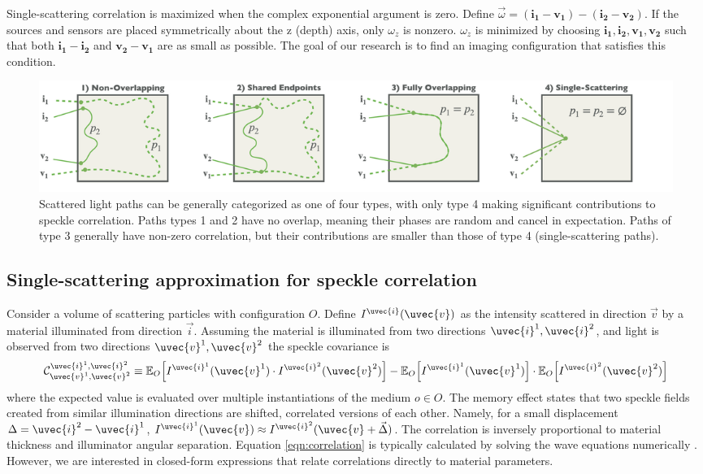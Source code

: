 Single-scattering correlation is maximized when the complex exponential argument is zero. Define $\vec{\omega} = (\mathbf{i_1} - \mathbf{v_1}) - (\mathbf{i_2} - \mathbf{v_2})$. If the sources and sensors are placed symmetrically about the z (depth) axis, only $\omega_z$ is nonzero. $\omega_z$ is minimized by choosing $\mathbf{i_1,i_2,v_1,v_2}$ such that both $\mathbf{i_1} - \mathbf{i_2}$ and $\mathbf{v_2} - \mathbf{v_1}$ are as small as possible. The goal of our research is to find an imaging configuration that satisfies this condition.
%
\begin{figure}
    \centering
    \includegraphics[width=\textwidth]{figures/path_types.png}
    \caption{Scattered light paths can be generally categorized as one of four types, with only type 4 making significant contributions to speckle correlation. Paths types 1 and 2 have no overlap, meaning their phases are random and cancel in expectation. Paths of type 3 generally have non-zero correlation, but their contributions are smaller than those of type 4 (single-scattering paths).}
    \label{fig:path_types}
\end{figure}

\subsection{Single-scattering approximation for speckle correlation}
Consider a volume of scattering particles with configuration $O$. Define $I^{\uvec{i}}(\uvec{v})$ as the intensity scattered in direction $\vec{v}$ by a material illuminated from direction $\vec{i}$. Assuming the material is illuminated from two directions $\uvec{i}^1, \uvec{i}^2$, and light is observed from two directions $\uvec{v}^1, \uvec{v}^2$ the speckle covariance is
%
\begin{equation}
    \mathcal{C}_{\uvec{v}^1,\uvec{v}^2}^{\uvec{i}^1,\uvec{i}^2} \equiv \mathbb{E}_O\Big[I^{\uvec{i}^1}(\uvec{v}^1) \cdot I^{\uvec{i}^2}(\uvec{v}^2)\Big] - \mathbb{E}_O\Big[I^{\uvec{i}^1}(\uvec{v}^1)\Big] \cdot \mathbb{E}_O\Big[I^{\uvec{i}^2}(\uvec{v}^2)\Big]
    \label{eqn:correlation}
\end{equation}
%
where the expected value is evaluated over multiple instantiations of the medium $o \in O$.
The memory effect states that two speckle fields created from similar illumination directions are shifted, correlated versions of each other. Namely, for a small displacement $\Delta = \uvec{i}^2 - \uvec{i}^1$, $I^{\uvec{i}^1}(\uvec{v}) \approx I^{\uvec{i}^2}(\uvec{v} + \vec{\Delta})$. The correlation is inversely proportional to material thickness and illuminator angular separation. Equation \ref{eqn:correlation} is typically calculated by solving the wave equations numerically \cite{thierry2015mu, treeby2010k, yee1966numerical}. However, we are interested in closed-form expressions that relate correlations directly to material parameters.

